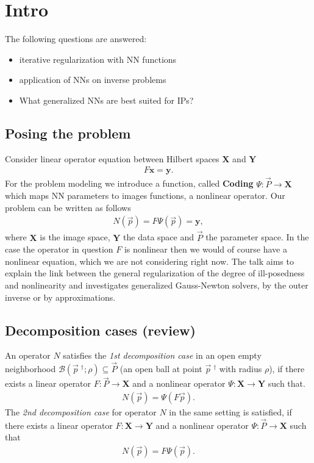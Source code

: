 




\maketitle

\tableofcontents

\section{Intro}
The following questions are answered:
\begin{itemize}
    \item iterative regularization with NN functions
    \item application of NNs on inverse problems
    \item What generalized NNs are best suited for IPs?
\end{itemize}

\subsection{Posing the problem}
Consider linear operator equation between Hilbert spaces $\mathbf{X}$ and
$\mathbf{Y}$
\begin{align}
    F\mathbf{x} = \mathbf{y}.
\end{align}
For the problem modeling we introduce a function, called \textbf{Coding}
$\Psi: \vec{P} \to \mathbf{X}$ which maps NN parameters to images functions,
a nonlinear operator. Our problem can be written as follows
\begin{align}
    N(\vec{p}) = F\Psi(\vec{p}) = \mathbf{y}, \label{eq: main}
\end{align}
where $\mathbf{X}$ is the image space, $\mathbf{Y}$ the data space and $\vec{P}$ the parameter
space. In the case the operator in question $F$ is nonlinear then we would of
course have a nonlinear equation, which we are not considering right now. The
talk aims to explain the link between the general regularization of the
degree of ill-posedness and nonlinearity and investigates generalized
Gauss-Newton solvers, by the outer inverse or by approximations.
\subsection{Decomposition cases (review)}
An operator $N$ satisfies the \textit{1st decomposition case} in an open empty
neighborhood $\mathcal{B}\left(\vec{p}\;^{\dagger}; \rho \right) \subseteq
\vec{P} $ (an open ball at point $\vec{p}\;^{\dagger}$ with radius $\rho$), if
there exists a linear operator $F:\vec{P}\to \mathbf{X}$ and a nonlinear
operator $\Psi:\mathbf{X} \to \mathbf{Y}$ such that.
\begin{align}
    N(\vec{p}) = \Psi(F\vec{p}).
\end{align}
The \textit{2nd decomposition case} for operator $N$ in the same setting is
satisfied, if there exists a linear operator $F: \mathbf{X} \to \mathbf{Y}$
and a nonlinear operator $\Psi: \vec{P} \to \mathbf{X}$ such that
\begin{align}
    N(\vec{p}) = F\Psi(\vec{p}).
\end{align}

